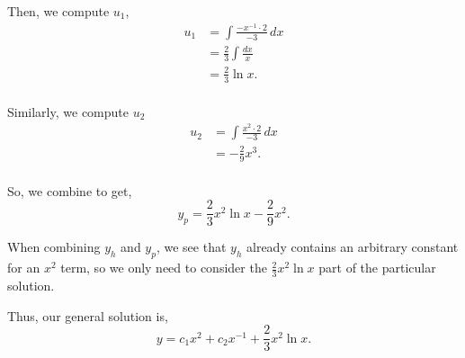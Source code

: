 \documentclass[../hw6]{subfiles}
\begin{document}
Then, we compute $u_1$,
\begin{align*}
    u_1&=\int\frac{-x^{-1}\cdot 2}{-3}\,dx \\
    &=\frac{2}{3}\int\frac{dx}{x} \\
    &=\frac{2}{3}\ln{x}. \\
\end{align*}

Similarly, we compute $u_2$
\begin{align*}
    u_2&=\int\frac{x^2\cdot 2}{-3}\,dx \\
    &=-\frac{2}{9}x^3. \\
\end{align*}

So, we combine to get,
\[y_p=\frac{2}{3}x^2\ln{x}-\frac{2}{9}x^2.\]

When combining $y_h$ and $y_p$, we see that $y_h$ already contains an arbitrary constant for an $x^2$ term, so we only need to consider the $\frac{2}{3}x^2\ln{x}$ part of the particular solution.

Thus, our general solution is,
\[y=c_1x^2+c_2x^{-1}+\frac{2}{3}x^2\ln{x}.\]
\end{document}
